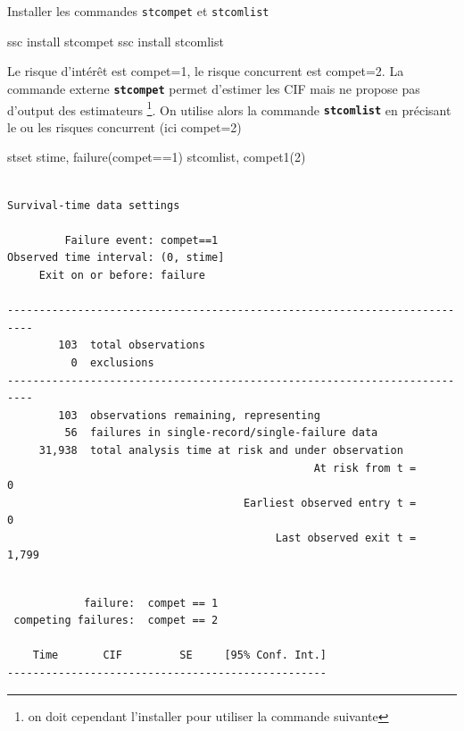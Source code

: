 \documentclass[
  12pt,
  letterpaper,
  DIV=11,
  numbers=noendperiod,
  onepage,
  openany]{scrreprt}
\newenvironment{Shaded}{\begin{snugshade}}{\end{snugshade}}
\newcommand{\KeywordTok}[1]{\textcolor[rgb]{0.94,0.87,0.69}{#1}}
\newcommand{\NormalTok}[1]{\textcolor[rgb]{0.80,0.80,0.80}{#1}}
\begin{document}
Installer les commandes \texttt{stcompet} et \texttt{stcomlist}

\begin{Shaded}
\begin{Highlighting}[]
\KeywordTok{ssc}\NormalTok{ install stcompet}
\KeywordTok{ssc}\NormalTok{ install stcomlist}
\end{Highlighting}
\end{Shaded}

Le risque d'intérêt est compet=1, le risque concurrent est compet=2. La
commande externe \textbf{\texttt{stcompet}} permet d'estimer les CIF
mais ne propose pas d'output des estimateurs \footnote{on doit cependant
  l'installer pour utiliser la commande suivante}. On utilise alors la
commande \textbf{\texttt{stcomlist}} en précisant le ou les risques
concurrent (ici compet=2)

\begin{Shaded}
\begin{Highlighting}[]
\KeywordTok{stset}\NormalTok{ stime, failure(compet==1)}
\NormalTok{stcomlist, compet1(2)}
\end{Highlighting}
\end{Shaded}

\begin{verbatim}

Survival-time data settings

         Failure event: compet==1
Observed time interval: (0, stime]
     Exit on or before: failure

--------------------------------------------------------------------------
        103  total observations
          0  exclusions
--------------------------------------------------------------------------
        103  observations remaining, representing
         56  failures in single-record/single-failure data
     31,938  total analysis time at risk and under observation
                                                At risk from t =         0
                                     Earliest observed entry t =         0
                                          Last observed exit t =     1,799
\end{verbatim}

\begin{verbatim}

            failure:  compet == 1
 competing failures:  compet == 2

    Time       CIF         SE     [95% Conf. Int.]
--------------------------------------------------
\end{verbatim}
\end{document}
